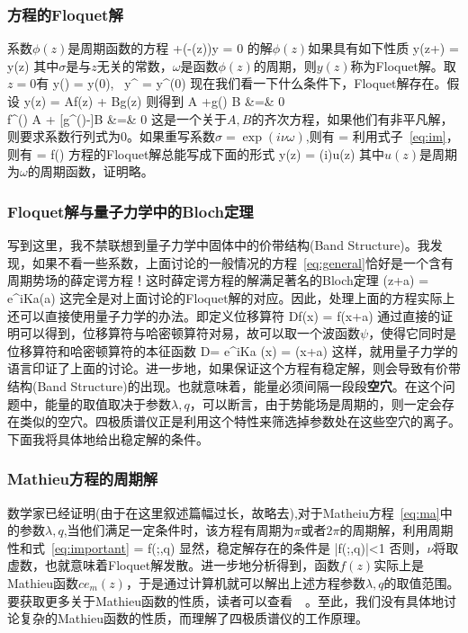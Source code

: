 \documentclass{ctexart}
\begin{document}
\subsubsection{方程的Floquet解}

\par 系数$\phi(z)$是周期函数的方程 
\beq 
{}+(\lambda-\phi(z))y = 0
\eeq
的解$\phi(z)$如果具有如下性质
\beq
y(z+\omega) = \sigma y(z)
\eeq
其中$\sigma$是与$z$无关的常数，$\omega$是函数$\phi(z)$的周期，则$y(z)$称为Floquet解。取$z=0$有
\beq
y(\omega) = \sigma y(0), \, y^{\prime} = \sigma y^{\prime}(0)
\eeq
现在我们看一下什么条件下，Floquet解存在。假设
\beq
y(z) = Af(z) + Bg(z)
\eeq
则得到
A +g(\omega) B &=& 0\\
    f^{\prime}(\omega) A + [g^{\prime}(\omega)-\sigma]B &=& 0
\eea
这是一个关于$A,B$的齐次方程，如果他们有非平凡解，则要求系数行列式为0。如果重写系数$\sigma = \exp(i\nu \omega)$,则有
\beq
\cos \nu \omega = 
\eeq
利用式子~\ref{eq:im}，则有
\beq\label{eq:important}
\cos\nu\omega = f(\omega)
\eeq
方程的Floquet解总能写成下面的形式
\beq
y(z) = \exp(i\nu \omega)u(z)
\eeq
其中$u(z)$是周期为$\omega$的周期函数，证明略。
\subsubsection{Floquet解与量子力学中的Bloch定理}
\par 写到这里，我不禁联想到量子力学中固体中的价带结构(Band Structure)。我发现，如果不看一些系数，上面讨论的一般情况的方程~\ref{eq:general}恰好是一个含有周期势场的薛定谔方程！这时薛定谔方程的解满足著名的Bloch定理
\beq
\psi(z+a) = e^{iKa}\psi(a)
\eeq
这完全是对上面讨论的Floquet解的对应。因此，处理上面的方程实际上还可以直接使用量子力学的办法。即定义位移算符
\beq
Df(x) = f(x+a)
\eeq
通过直接的证明可以得到，位移算符与哈密顿算符对易，故可以取一个波函数$\psi$，使得它同时是位移算符和哈密顿算符的本征函数
\beq
D\psi = e^{iKa} \psi(x) = \psi(x+a)
\eeq
这样，就用量子力学的语言印证了上面的讨论。进一步地，如果保证这个方程有稳定解，则会导致有价带结构(Band Structure)的出现。也就意味着，能量必须间隔一段段\textbf{空穴}。在这个问题中，能量的取值取决于参数$\lambda,q$，可以断言，由于势能场是周期的，则一定会存在类似的空穴。四极质谱仪正是利用这个特性来筛选掉参数处在这些空穴的离子。下面我将具体地给出稳定解的条件。

\subsubsection{Mathieu方程的周期解}
\par 数学家已经证明(由于在这里叙述篇幅过长，故略去),对于Matheiu方程~\ref{eq:ma}中的参数$\lambda,q$,当他们满足一定条件时，该方程有周期为$\pi$或者$2\pi$的周期解，利用周期性和式~\ref{eq:important}
\beq
\cos\nu \pi = f(\pi;\lambda,q)
\eeq
显然，稳定解存在的条件是
\beq
|f(\pi;\lambda,q)|<1
\eeq
否则，$\nu$将取虚数，也就意味着Floquet解发散。进一步地分析得到，函数$f(z)$实际上是Mathieu函数$ce_m(z)$，于是通过计算机就可以解出上述方程参数$\lambda,q$的取值范围。要获取更多关于Mathieu函数的性质，读者可以查看~\cite{ma_func}~\cite{special_func}。至此，我们没有具体地讨论复杂的Mathieu函数的性质，而理解了四极质谱仪的工作原理。
\end{document}
